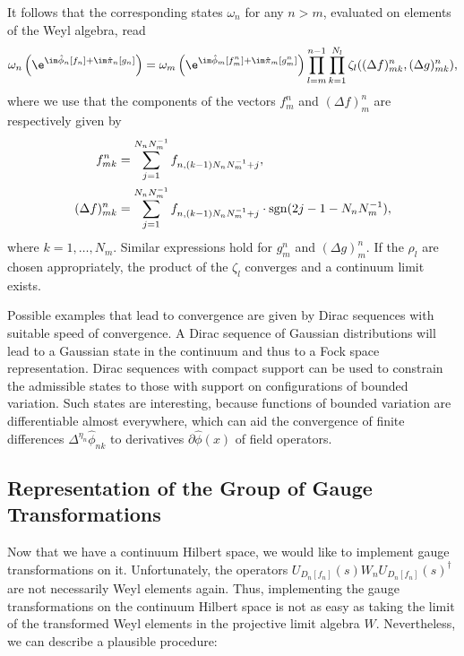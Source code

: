 It follows that the corresponding states $\omega_n$ for any $n>m$, evaluated on elements of the Weyl algebra, read
\begin{equation}
    \omega_n\left(\e^{\im\hat\phi_n[f_n] + \im\hat\pi_n[g_n]}\right) = \omega_{m}\left(\e^{\im\hat\phi_{m}[f^n_{m}] + \im\hat\pi_{m}[g^n_{m}]}\right) \prod_{l=m}^{n-1} \prod_{k=1}^{N_l} \zeta_l ((\Delta f)^n_{m k}, (\Delta g)^n_{m k}),
\end{equation}
where we use that the components of the vectors $f^n_{m}$ and $(\Delta f)^n_m$ are respectively given by
\begin{align}
    f^n_{m k} &= \sum_{j=1}^{N_n N_{m}^{-1} } f_{n, (k-1) N_n N_{m}^{-1} +j}, \\
    (\Delta f)^n_{m k} &= \sum_{j=1}^{N_n N_{m}^{-1}} f_{n, (k-1) N_n N_{m}^{-1} +j} \cdot \operatorname{sgn} (2j -1- N_n N_{m}^{-1}),
\end{align}
where $k =1,\dots, N_{m}$. Similar expressions hold for $g^n_{m}$ and $(\Delta g)^n_m$.
If the $\rho_l$ are chosen appropriately, the product of the $\zeta_l$ converges and a continuum limit exists.

Possible examples that lead to convergence are given by Dirac sequences with suitable speed of convergence.
A Dirac sequence of Gaussian distributions will lead to a Gaussian state in the continuum and thus to a Fock space representation.
Dirac sequences with compact support can be used to constrain the admissible states to those with support on configurations of bounded variation.
Such states are interesting, because functions of bounded variation are differentiable almost everywhere, which can aid the convergence of finite differences $\Delta^{\eta_n} \hat\phi_{nk}$ to derivatives $\partial\hat\phi(x)$ of field operators.

\subsection{Representation of the Group of Gauge Transformations}
Now that we have a continuum Hilbert space, we would like to implement gauge transformations on it.
Unfortunately, the operators $U_{D_n[f_n]}(s) W_n U_{D_n[f_n]}(s)^\dagger$ are not necessarily Weyl elements again.
Thus, implementing the gauge transformations on the continuum Hilbert space is not as easy as taking the limit of the transformed Weyl elements in the projective limit algebra $W$.
Nevertheless, we can describe a plausible procedure:

